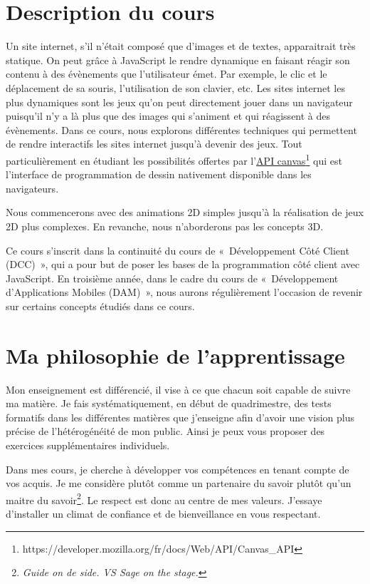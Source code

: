 \section{Description du cours}

Un site internet, s’il n’était composé que d’images et de textes, apparaitrait très statique. On peut grâce à JavaScript le rendre dynamique en faisant réagir son contenu à des évènements que l’utilisateur émet. Par exemple, le clic et le déplacement de sa souris, l’utilisation de son clavier, etc. Les sites internet les plus dynamiques sont les jeux qu’on peut directement jouer dans un navigateur puisqu'il n'y a là plus que des images qui s’animent et qui réagissent à des évènements.
Dans ce cours, nous explorons différentes techniques qui permettent de rendre interactifs les sites internet jusqu’à devenir des jeux. Tout particulièrement en étudiant les possibilités offertes par l’\href{https://developer.mozilla.org/fr/docs/Web/API/Canvas_API}{API canvas}\footnote{https://developer.mozilla.org/fr/docs/Web/API/Canvas\_API} qui est l'interface  de programmation de dessin nativement disponible dans les navigateurs.

Nous commencerons avec des animations 2D simples jusqu’à la réalisation de jeux 2D plus complexes. En revanche, nous n’aborderons pas les concepts 3D.

Ce cours s’inscrit dans la continuité du cours de «~Développement Côté Client (DCC)~», qui a pour but de poser les bases de la programmation côté client avec JavaScript. En troisième année, dans le cadre du cours de «~Développement d'Applications Mobiles (DAM)~», nous aurons régulièrement l’occasion de revenir sur certains concepts étudiés dans ce cours.
\clearpage
\section{Ma philosophie de l’apprentissage}


Mon enseignement est différencié, il vise à ce que chacun soit capable de suivre ma matière. Je fais systématiquement, en début de quadrimestre, des tests formatifs dans les différentes matières que j'enseigne afin d’avoir une vision plus précise de l’hétérogénéité de mon public. Ainsi je peux vous proposer des exercices supplémentaires individuels.\cite{lawrence2004differentiated}

Dans mes cours, je cherche à développer vos compétences en tenant compte de vos acquis. Je me considère plutôt comme un partenaire du savoir plutôt qu'un maitre du savoir\footnote{\textit{Guide on de side. VS Sage on the stage.}}. Le respect est donc au centre de mes valeurs. J’essaye d’installer un climat de confiance et de bienveillance en vous respectant. %

